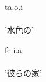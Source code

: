 \begin{exe}
    \ex \gll ta.o.i \\ %
    \\
        \glt '水色の'
\end{exe}
\begin{exe}
    \ex \gll fe.i.a \\ %
    \\
        \glt '彼らの家'
\end{exe}
